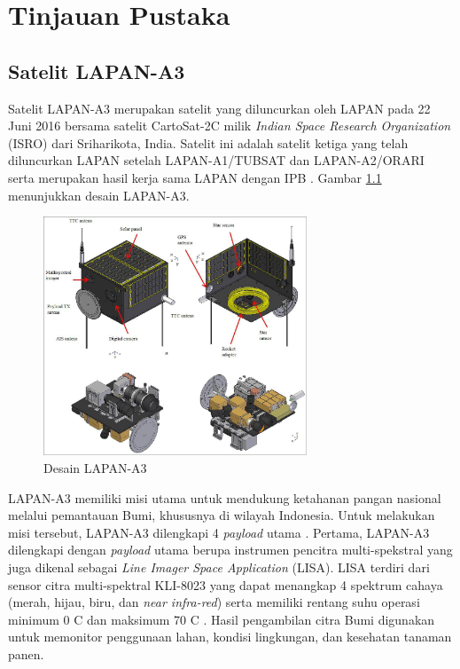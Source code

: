 \chapter{Tinjauan Pustaka}

\section{Satelit LAPAN-A3}

Satelit LAPAN-A3 merupakan satelit yang diluncurkan oleh LAPAN pada 22 Juni
2016 bersama satelit CartoSat-2C milik \textit{Indian Space Research
Organization} (ISRO) dari Sriharikota, India. Satelit ini adalah satelit ketiga
yang telah diluncurkan LAPAN setelah LAPAN-A1/TUBSAT dan LAPAN-A2/ORARI serta
merupakan hasil kerja sama LAPAN dengan IPB \cite{hasbi2013}. Gambar
\ref{fig:a3overview} menunjukkan desain LAPAN-A3.

\begin{figure}[!ht]
\setlength{}
\begin{center}
\includegraphics[width=0.7\textwidth]{fig/a3overview.jpg}
	\caption[Desain LAPAN-A3]{Desain LAPAN-A3~\cite{hasbi2013}}
\label{fig:a3overview}
\end{center}
\end{figure}

LAPAN-A3 memiliki misi utama untuk mendukung ketahanan pangan nasional melalui
pemantauan Bumi, khususnya di wilayah Indonesia. Untuk melakukan misi tersebut,
LAPAN-A3 dilengkapi 4 \textit{payload} utama \cite{hartono2019}. Pertama,
LAPAN-A3 dilengkapi dengan \textit{payload} utama berupa instrumen pencitra
multi-spekstral yang juga dikenal sebagai \textit{Line Imager Space
Application} (LISA). LISA terdiri dari sensor citra multi-spektral KLI-8023
yang dapat menangkap 4 spektrum cahaya (merah, hijau, biru, dan \textit{near
infra-red}) serta memiliki rentang suhu operasi minimum 0 \degree C dan
maksimum 70 \degree C \cite{semiconductor2017}. Hasil pengambilan citra Bumi
digunakan untuk memonitor penggunaan lahan, kondisi lingkungan, dan kesehatan
tanaman panen.

